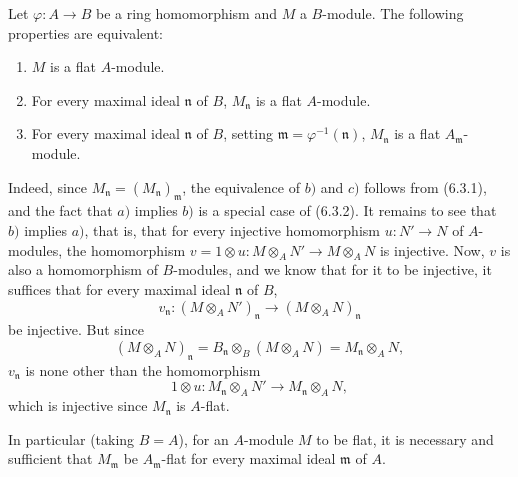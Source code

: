 \begin{env}[6.3.3]
\label{0.6.3.3}
Let $\varphi:A\to B$ be a ring homomorphism and $M$ a $B$-module. The
following properties are equivalent:
\begin{enumerate}
  \item[$a)$] $M$ is a flat $A$-module.
  \item[$b)$] For every maximal ideal $\mathfrak{n}$ of $B$,
    $M_\mathfrak{n}$ is a flat $A$-module.
  \item[$c)$] For every maximal ideal $\mathfrak{n}$ of $B$, setting
    $\mathfrak{m}=\varphi^{-1}(\mathfrak{n})$, $M_\mathfrak{n}$ is a
    flat $A_\mathfrak{m}$-module.
\end{enumerate}

Indeed, since $M_\mathfrak{n}=(M_\mathfrak{n})_\mathfrak{m}$,
the equivalence of $b)$ and $c)$ follows from (6.3.1), and the fact that $a)$
implies $b)$ is a special case of (6.3.2). It remains to see that $b)$
implies $a)$,
that is, that for every injective homomorphism $u:N'\to N$ of
$A$-modules, the homomorphism
$v=1\otimes u:M\otimes_A N'\to M\otimes_A N$ is injective. Now, $v$ is also
a homomorphism of $B$-modules, and we know that for it to be injective, it
suffices that for every maximal ideal $\mathfrak{n}$ of $B$,
\[
  v_\mathfrak{n}:(M\otimes_A N')_\mathfrak{n}
  \longrightarrow(M\otimes_A N)_\mathfrak{n}
\]
be injective. But since
\[
  (M\otimes_A N)_\mathfrak{n}
  =B_\mathfrak{n}\otimes_B(M\otimes_A N)
  =M_\mathfrak{n}\otimes_A N,
\]
$v_\mathfrak{n}$ is none other than the homomorphism
\[
  1\otimes u:M_\mathfrak{n}\otimes_A N'
  \longrightarrow M_\mathfrak{n}\otimes_A N,
\]
which is injective since $M_\mathfrak{n}$ is $A$-flat.

In particular (taking $B=A$), for an $A$-module $M$ to be flat, it is
necessary and sufficient that $M_\mathfrak{m}$ be $A_\mathfrak{m}$-flat for every
maximal ideal $\mathfrak{m}$ of $A$.
\end{env}

